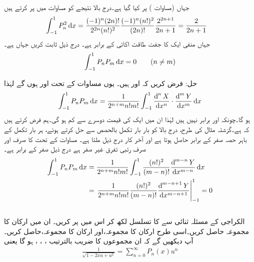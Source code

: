 جہاں   (مساوات ) پر کیا گیا ہے۔درج بالا نتیجے کو مساوات  میں پر کرتے ہیں
 \begin{align}\label{مساوات_طاقتی_لیژانڈر_معیار}
\int_{-1}^{1} P_n^2  \dif x&=\frac{(-1)^n (2n)!}{2^{2n}(n!)^2}\frac{(-1)^n(n!)^2}{(2n)!}\frac{2^{2n+1}}{2n+1}=\frac{2}{2n+1}
\end{align}
جہاں منفی ایک کا جفت طاقت اکائی کے برابر  ہے۔
درج ذیل ثابت کریں جہاں  ہے۔
\begin{align}
\int_{-1}^{1}P_nP_m \dif x=0\quad \quad (n \ne m)
\end{align}

حل: فرض کریں کہ  اور  ہیں۔ یوں مساوات  کے تحت
  اور    ہوں گے لہٰذا
\begin{align*}
\int_{-1}^{1}P_n P_m \dif x=\frac{1}{2^{n+m}n!m!}\int_{-1}^{1} \frac{\dif^{\,n}X}{\dif x^n}\cdot \frac{\dif^{\,m}Y}{\dif x^m}\dif x
\end{align*}
ہو گا۔چونکہ  اور  برابر نہیں ہیں لہٰذا ان میں ایک کی قیمت دوسرے سے کم ہو گی۔ہم فرض کرتے ہیں کہ  ہے۔گزشتہ مثال کی طرح، درج بالا کو بار بار تکمل بالحصص سے حل کرتے ہوئے، ہر بار تکمل کے باہر حصہ صفر کے برابر حاصل ہوتا ہے اور آخر کار درج ذیل ملتا ہے۔ مساوات  کے تحت  کا صرف اور صرف  رتبی تفرق غیر صفر ہے درج ذیل صفر کے برابر ہے۔
\begin{align*}
\int_{-1}^{1}P_nP_m\dif x&=\frac{1}{2^{n+m}n!m!}\int_{-1}^{1} \frac{(n!)^2}{(m-n)!}\frac{\dif^{\,m-n}Y}{\dif x^{m-n}}\dif x\\
&=\left. \frac{1}{2^{n+m}n!m!} \frac{(n!)^2}{(m-n)!}\frac{\dif^{\,m-n+1}Y}{\dif x^{m-n+1}}\right|_{-1}^{1}=0
\end{align*}
\quad {}\\
الکراجی کے مسئلہ ثنائی سے  کا تسلسل لکھ کر اس میں  پر کریں۔ ان میں  ارکان کا مجموعہ حاصل کریں۔اسی طرح   ارکان کا مجموعہ،اور  ارکان کا مجموعہ،  حاصل کریں۔آپ دیکھیں گے کہ ان مجموعوں کا  ضریب  بالترتیب ، ، ،  ہو گا یعنی
\begin{align}\label{مساوات_بیسل_پیداکار_تفاعل_لیژانڈر}
\frac{1}{\sqrt{1-2xu+u^2}}=\sum_{n=0}^{\infty}P_n(x)u^n
\end{align}

